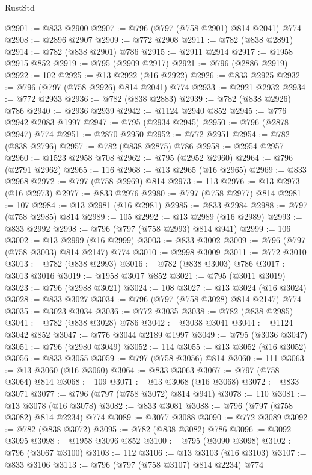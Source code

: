 \begin{lexlean}{RustStd}
\begin{coremodule}
{\begin{coremodule}
{{{{{{{{{{{{{{@2901 := @833 @2900
@2907 := @796 (@797 (@758 @2901) @814 @2041) @774
@2908 := @2896 @2907
@2909 := @772 @2908
@2911 := @782 (@838 @2891)
@2914 := @782 (@838 @2901) @786
@2915 := @2911 @2914
@2917 := @1958 @2915 @852
@2919 := @795 (@2909 @2917)
@2921 := @796 (@2886 @2919)
@2922 := 102
@2925 := @13 @2922 (@16 @2922)
@2926 := @833 @2925
@2932 := @796 (@797 (@758 @2926) @814 @2041) @774
@2933 := @2921 @2932
@2934 := @772 @2933
@2936 := @782 (@838 @2883)
@2939 := @782 (@838 @2926) @786
@2940 := @2936 @2939
@2942 := @1124 @2940 @852
@2945 := @776 @2942 @2083 @1997
@2947 := @795 (@2934 @2945)
@2950 := @796 (@2878 @2947) @774
@2951 := @2870 @2950
@2952 := @772 @2951
@2954 := @782 (@838 @2796)
@2957 := @782 (@838 @2875) @786
@2958 := @2954 @2957
@2960 := @1523 @2958 @708
@2962 := @795 (@2952 @2960)
@2964 := @796 (@2791 @2962)
@2965 := 116
@2968 := @13 @2965 (@16 @2965)
@2969 := @833 @2968
@2972 := @797 (@758 @2969) @814
@2973 := 113
@2976 := @13 @2973 (@16 @2973)
@2977 := @833 @2976
@2980 := @797 (@758 @2977) @814
@2981 := 107
@2984 := @13 @2981 (@16 @2981)
@2985 := @833 @2984
@2988 := @797 (@758 @2985) @814
@2989 := 105
@2992 := @13 @2989 (@16 @2989)
@2993 := @833 @2992
@2998 := @796 (@797 (@758 @2993) @814 @941)
@2999 := 106
@3002 := @13 @2999 (@16 @2999)
@3003 := @833 @3002
@3009 := @796 (@797 (@758 @3003) @814 @2147) @774
@3010 := @2998 @3009
@3011 := @772 @3010
@3013 := @782 (@838 @2993)
@3016 := @782 (@838 @3003) @786
@3017 := @3013 @3016
@3019 := @1958 @3017 @852
@3021 := @795 (@3011 @3019)
@3023 := @796 (@2988 @3021)
@3024 := 108
@3027 := @13 @3024 (@16 @3024)
@3028 := @833 @3027
@3034 := @796 (@797 (@758 @3028) @814 @2147) @774
@3035 := @3023 @3034
@3036 := @772 @3035
@3038 := @782 (@838 @2985)
@3041 := @782 (@838 @3028) @786
@3042 := @3038 @3041
@3044 := @1124 @3042 @852
@3047 := @776 @3044 @2189 @1997
@3049 := @795 (@3036 @3047)
@3051 := @796 (@2980 @3049)
@3052 := 114
@3055 := @13 @3052 (@16 @3052)
@3056 := @833 @3055
@3059 := @797 (@758 @3056) @814
@3060 := 111
@3063 := @13 @3060 (@16 @3060)
@3064 := @833 @3063
@3067 := @797 (@758 @3064) @814
@3068 := 109
@3071 := @13 @3068 (@16 @3068)
@3072 := @833 @3071
@3077 := @796 (@797 (@758 @3072) @814 @941)
@3078 := 110
@3081 := @13 @3078 (@16 @3078)
@3082 := @833 @3081
@3088 := @796 (@797 (@758 @3082) @814 @2234) @774
@3089 := @3077 @3088
@3090 := @772 @3089
@3092 := @782 (@838 @3072)
@3095 := @782 (@838 @3082) @786
@3096 := @3092 @3095
@3098 := @1958 @3096 @852
@3100 := @795 (@3090 @3098)
@3102 := @796 (@3067 @3100)
@3103 := 112
@3106 := @13 @3103 (@16 @3103)
@3107 := @833 @3106
@3113 := @796 (@797 (@758 @3107) @814 @2234) @774
}}}}}}}}}}}}}}
\end{coremodule}}
\end{coremodule}
\end{lexlean}
